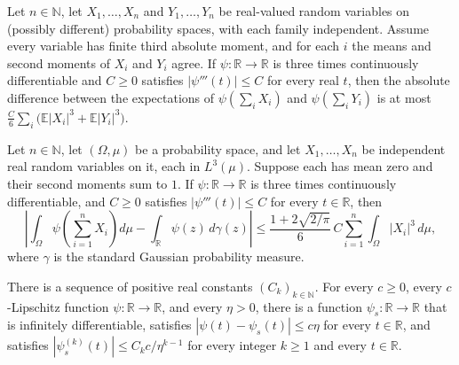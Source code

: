 \begin{theorem}
\label{BooleanAnalysis.GaussianSpace.sum_invariance}
\leanok
{}
Let $n\in\mathbb N$, let $X_1,\ldots,X_n$ and $Y_1,\ldots,Y_n$ be real-valued random
variables on (possibly different) probability spaces, with each family independent.
Assume every variable has finite third absolute moment, and for each $i$ the means and
second moments of $X_i$ and $Y_i$ agree. If $\psi\colon\mathbb R\to\mathbb R$ is three
times continuously differentiable and $C\ge0$ satisfies $|\psi'''(t)|\le C$ for every
real $t$, then the absolute difference between the expectations of $\psi(\sum_i X_i)$
and $\psi(\sum_i Y_i)$ is at most $\frac C6\sum_i\bigl(\mathbb E|X_i|^3+\mathbb
E|Y_i|^3\bigr)$.
\end{theorem}

\begin{theorem}
\label{BooleanAnalysis.GaussianSpace.variant_berryEsseen}
\leanok
{}
Let $n\in\mathbb N$, let $(\Omega,\mu)$ be a probability space, and let $X_1,\ldots,X_n$
be independent real random variables on it, each in $L^3(\mu)$. Suppose each has mean
zero and their second moments sum to $1$. If $\psi:\mathbb R\to\mathbb R$ is three times
continuously differentiable, and $C\ge0$ satisfies $|\psi'''(t)|\le C$ for every
$t\in\mathbb R$, then
\[
\left|\int_\Omega\psi\!\left(\sum_{i=1}^n X_i\right)d\mu-\int_{\mathbb
R}\psi(z)\,d\gamma(z)\right|
\le \frac{1+2\sqrt{2/\pi}}{6}\,C\sum_{i=1}^n\int_\Omega|X_i|^3\,d\mu,
\]
where $\gamma$ is the standard Gaussian probability measure.
\end{theorem}

\begin{theorem}
\label{BooleanAnalysis.GaussianSpace.exists_smooth_lipschitz_approximation}
\leanok
There is a sequence of positive real constants $(C_k)_{k\in\mathbb N}$. For every $c\ge
0$, every $c$-Lipschitz function $\psi\colon\mathbb R\to\mathbb R$, and every $\eta>0$,
there is a function $\psi_s\colon\mathbb R\to\mathbb R$ that is infinitely
differentiable, satisfies $|\psi(t)-\psi_s(t)|\le c\eta$ for every $t\in\mathbb R$, and
satisfies $|\psi_s^{(k)}(t)|\le C_k c/\eta^{k-1}$ for every integer $k\ge 1$ and every
$t\in\mathbb R$.
\end{theorem}

